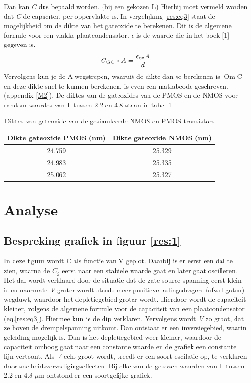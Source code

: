 Dan kan \textit{C} dus bepaald worden. (bij een gekozen L) Hierbij moet vermeld worden dat \textit{C} de capaciteit per oppervlakte is. In vergelijking \ref{res:eq3} staat de mogelijkheid om de dikte van het gateoxide te berekenen. Dit is de algemene formule voor een vlakke plaatcondensator. \textit{$\epsilon$} is de waarde die in het boek [1] gegeven is. 
 \begin{equation} \label{res:eq3}
 C\textsubscript{GC}*A = \frac { \epsilon\textsubscript{ox} A } {d}
 \end{equation}
 Vervolgens kun je de A wegstrepen, waaruit de dikte dan te berekenen is. Om C en deze dikte snel te kunnen berekenen, is even een matlabcode geschreven. (appendix \ref{M2}). De diktes van de gateoxides van de PMOS en de NMOS voor random waardes van L tussen 2.2 en 4.8 staan in tabel \ref{res:tab1}.
 \begin{table} [h!]
  \begin{tabular}{ | c |c| } 
 \hline
   Dikte gateoxide PMOS (nm) & Dikte gateoxide NMOS (nm) \\ \hline
     24.759 &  25.329  \\ \hline
      24.983 &    25.335 \\ \hline
       25.062 &   25.327\\ \hline
     
 \end{tabular}
 \caption{Diktes van gateoxide van de gesimuleerde NMOS en PMOS transistors}
 \label{res:tab1}
  \end{table}
 \section{Analyse}
 \subsection{Bespreking grafiek in figuur \ref{res:1} }
 In deze figuur wordt C als functie van V geplot. Daarbij is er eerst een dal te zien, waarna de \textit{$C_g$} eerst  naar een stabiele waarde gaat en later gaat oscilleren.   Het dal wordt verklaard door de situatie dat de gate-source spanning eerst klein is en naarmate \textit{V} groter wordt steeds meer positieve ladingsdragers (ofwel gaten) wegduwt, waardoor het depletiegebied groter wordt. Hierdoor wordt de capaciteit kleiner, volgens de algemene formule voor de capaciteit van een plaatcondensator (eq.\ref{res:eq3}). Hiermee kun je de dip verklaren. Vervolgens wordt \textit{V} zo groot, dat ze boven de drempelspanning uitkomt. Dan ontstaat er een inversiegebied, waarin geleiding mogelijk is. Dan is het depletiegebied weer kleiner, waardoor de capaciteit omhoog gaat naar een constante waarde en de grafiek een constante lijn vertoont. Als \textit{V} echt groot wordt, treedt er een soort oscilatie op, te verklaren door snelheidsverzadigingseffecten. Bij elke van de gekozen waarden van L tussen 2.2 en 4.8 $\mu$m ontstond er een soortgelijke grafiek. 
